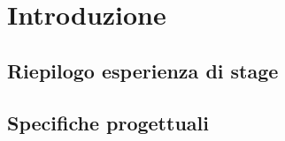 \mainmatter
\chapter{Introduzione}
\section{Riepilogo esperienza di stage}
\section{Specifiche progettuali}